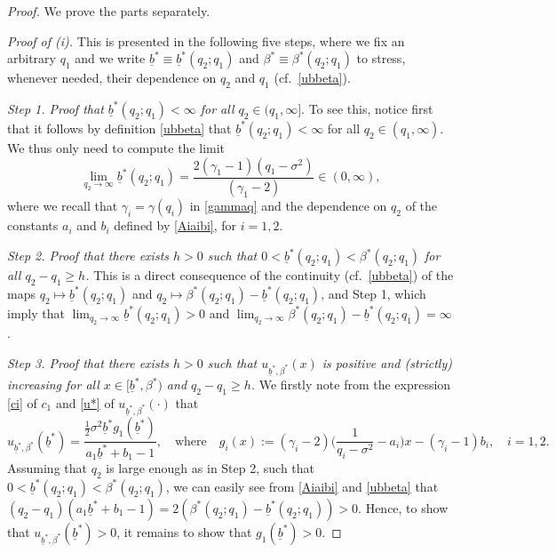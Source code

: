 \documentclass[11pt]{article} %
\def\ub{\underline{b}}
\numberwithin{komcounter}{section}
\begin{document}
\begin{proof}
We prove the parts separately.

\vspace{1mm}
{\it Proof of (i).} 
This is presented in the following five steps, where we fix an arbitrary $q_1$ and we write $\ub^* \equiv \ub^*(q_2;q_1)$ and $\beta^* \equiv \beta^*(q_2;q_1)$ to stress, whenever needed, their dependence on $q_2$ and $q_1$ (cf.~\eqref{ubbeta}).

\vspace{1mm}
{\it Step 1. Proof that $\ub^*(q_2;q_1) <\infty$ for all $q_2 \in (q_1, \infty]$}.
To see this, notice first that it follows by definition \eqref{ubbeta} that $\ub^*(q_2;q_1) <\infty$ for all $q_2 \in (q_1, \infty)$. 
We thus only need to compute the limit  
$$
\lim_{q_2 \to \infty} \ub^*(q_2;q_1) = \frac{2(\gamma_1-1) (q_1-\sigma^2)}{(\gamma_1-2)} \in (0,\infty), 
$$
where we recall that $\gamma_i = \gamma(q_i)$ in \eqref{gammaq} and the dependence on $q_2$ of the constants $a_i$ and $b_i$ defined by \eqref{Aiaibi}, for $i=1,2$.

\vspace{1mm}
{\it Step 2. Proof that there exists $h>0$ such that $0 < \ub^*(q_2;q_1) <\beta^* (q_2;q_1)$ for all $q_2-q_1\geq h$.}
This is a direct consequence of the continuity (cf.~\eqref{ubbeta}) of the maps $q_2 \mapsto \ub^*(q_2;q_1)$ and $q_2 \mapsto \beta^* (q_2;q_1) - \ub^*(q_2;q_1)$, and Step 1, which imply that $\lim_{q_2 \to \infty} \ub^*(q_2;q_1) > 0$ and  $\lim_{q_2 \to \infty} \beta^* (q_2;q_1) - \ub^*(q_2;q_1) = \infty$.

\vspace{1mm}
{\it Step 3. Proof that there exists $h>0$ such that $u_{\ub^*,\beta^*}(x)$ is positive and (strictly) increasing for all $x\in [\ub^*,\beta^*)$ and $q_2-q_1\geq h$.}
We firstly note from the expression \eqref{ci} of $c_1$ and \eqref{u*} of $u_{\ub^*,\beta^*}(\cdot)$ that 
\begin{equation} \label{ub*}
u_{\ub^*,\beta^*}(\ub^*) 
=\frac{\tfrac12 \sigma^2 \ub^* g_1(\ub^*)}{a_1 \ub^* + b_1 - 1}, 
\quad \text{where} \quad 
g_i(x) := (\gamma_i - 2) \Big(\frac{1}{q_i - \sigma^2} - a_i \Big) x - (\gamma_i - 1) b_i 
, \quad i=1,2.
\end{equation}
Assuming that $q_2$ is large enough as in Step 2, such that $0 < \ub^*(q_2;q_1) <\beta^* (q_2;q_1)$,  we can easily see from \eqref{Aiaibi} and \eqref{ubbeta} that 
$(q_2 - q_1) (a_1 \ub^* + b_1 - 1)  
= 2 (\beta^*(q_2;q_1) - \ub^*(q_2;q_1)) > 0$.
Hence, to show that $u_{\ub^*,\beta^*}(\ub^*)>0$, it remains to show that 
$g_1(\ub^*) > 0$. 


\end{proof}
\end{document}
